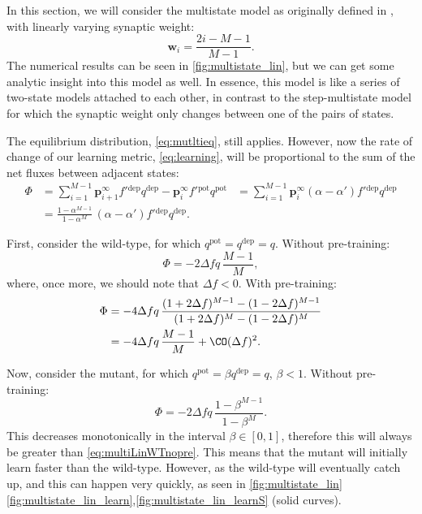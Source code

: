 \documentclass[12pt]{article}
\newcommand{\pr}{\mathbf{p}}
\newcommand{\eq}{\pr^\infty}
\newcommand{\w}{\mathbf{w}}
\newcommand{\pot}{^{\text{pot}}}
\newcommand{\dep}{^{\text{dep}}}
\begin{document}


In this section, we will consider the multistate model as originally defined in \cite{amit1994learning}, \ie with linearly varying synaptic weight:
%
\begin{equation}\label{eq:multistateLinWeight}
  \w_i = \frac{2i-M-1}{M-1}.
\end{equation}
%
The numerical results can be seen in \autoref{fig:multistate_lin}, but we can get some analytic insight into this model as well.
In essence, this model is like a series of two-state models attached to each other, in contrast to the step-multistate model for which the synaptic weight only changes between one of the pairs of states.


The equilibrium distribution, \eqref{eq:mutltieq}, still applies.
However, now the rate of change of our learning metric, \eqref{eq:learning}, will be proportional to the sum of the net fluxes between adjacent states:
%
\begin{equation}\label{eq:multiLinFlux}
  \begin{aligned}
    \Phi &= \sum_{i=1}^{M-1} \eq_{i+1} f'{}\dep q\dep - \eq_i f'{}\pot q\pot
         &= \sum_{i=1}^{M-1} \eq_i (\alpha-\alpha') f'{}\dep q\dep \\
         &= \frac{1-\alpha^{M-1}}{1-\alpha^M} \, (\alpha-\alpha') f'{}\dep q\dep.
  \end{aligned}
\end{equation}
%

First, consider the wild-type, for which $q\pot=q\dep=q$.
Without pre-training:
%
\begin{equation}\label{eq:multiLinWTnopre}
  \Phi = -2\Delta fq\,\frac{M-1}{M},
\end{equation}
%
where, once more, we should note that $\Delta f<0$.
With pre-training:
%
\begin{equation}\label{eq:multiLinWTpre}
\begin{aligned}
  \Phi &= -4\Delta f q \, \frac{(1+2\Delta f)^{M-1} - (1-2\Delta f)^{M-1}}
          {(1+2\Delta f)^M - (1-2\Delta f)^M} \\
       &= -{4\Delta f q}\,\frac{M-1}{M} + \CO(\Delta f)^2.
\end{aligned}
\end{equation}
%

Now, consider the mutant, for which $q\pot=\beta q\dep=q$, $\beta<1$.
Without pre-training:
%
\begin{equation}\label{eq:multiLinKOnopre}
  \Phi = -2\Delta f q\,\frac{1-\beta^{M-1}}{1-\beta^M}.
\end{equation}
%
This decreases monotonically in the interval $\beta\in[0,1]$, therefore this will always be greater than \eqref{eq:multiLinWTnopre}.
This means that the mutant will initially learn faster than the wild-type.
However, as the wild-type will eventually catch up, and this can happen very quickly, as seen in \autoref{fig:multistate_lin}\ref{fig:multistate_lin_learn},\ref{fig:multistate_lin_learnS} (solid curves).
\end{document}
